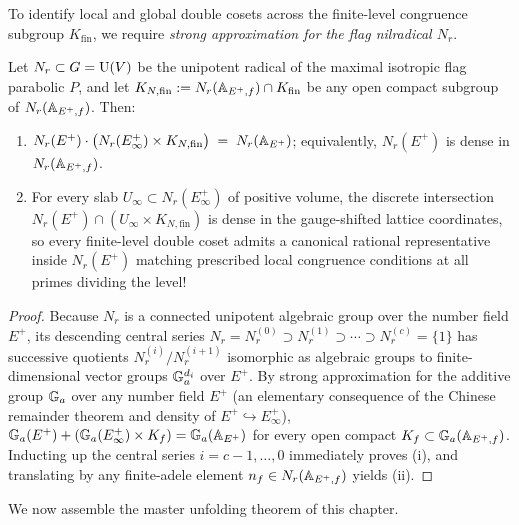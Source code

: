 To identify local and global double cosets across the finite-level congruence subgroup $K_{\mathrm{fin}}$, we require \emph{strong approximation for the flag nilradical $N_r$}.

\begin{lemma}
\label{lem:15:nilradical-sa}
Let $N_r \subset G = \mathrm{U}(V)$ be the unipotent radical of the maximal isotropic flag parabolic $P$, and let $K_{N, \mathrm{fin}} := N_r(\mathbb{A}_{E^+, f}) \cap K_{\mathrm{fin}}$ be any open compact subgroup of $N_r(\mathbb{A}_{E^+, f})$. Then:
\begin{enumerate}[label=\textup{(\roman*)}]
\item $N_r(E^+) \cdot \bigl(N_r(E^+_\infty) \times K_{N, \mathrm{fin}}\bigr) \;=\; N_r(\mathbb{A}_{E^+})$; equivalently, $N_r(E^+)$ is dense in $N_r(\mathbb{A}_{E^+, f})$.
\item For every slab $U_\infty \subset N_r(E^+_\infty)$ of positive volume, the discrete intersection $N_r(E^+) \cap (U_\infty \times K_{N, \mathrm{fin}})$ is dense in the gauge-shifted lattice coordinates, so every finite-level double coset admits a canonical rational representative inside $N_r(E^+)$ matching prescribed local congruence conditions at all primes dividing the level!
\end{enumerate}
\end{lemma}

\begin{proof}
Because $N_r$ is a connected unipotent algebraic group over the number field $E^+$, its descending central series $N_r = N_r^{(0)} \supset N_r^{(1)} \supset \cdots \supset N_r^{(c)} = \{1\}$ has successive quotients $N_r^{(i)} / N_r^{(i+1)}$ isomorphic as algebraic groups to finite-dimensional vector groups $\mathbb{G}_a^{d_i}$ over $E^+$. By strong approximation for the additive group $\mathbb{G}_a$ over any number field $E^+$ (an elementary consequence of the Chinese remainder theorem and density of $E^+ \hookrightarrow E^+_\infty$), $\mathbb{G}_a(E^+) + (\mathbb{G}_a(E^+_\infty) \times K_f) = \mathbb{G}_a(\mathbb{A}_{E^+})$ for every open compact $K_f \subset \mathbb{G}_a(\mathbb{A}_{E^+, f})$. Inducting up the central series $i = c - 1, \dots, 0$ immediately proves (i), and translating by any finite-adele element $n_f \in N_r(\mathbb{A}_{E^+, f})$ yields (ii).
\end{proof}

We now assemble the master unfolding theorem of this chapter.

